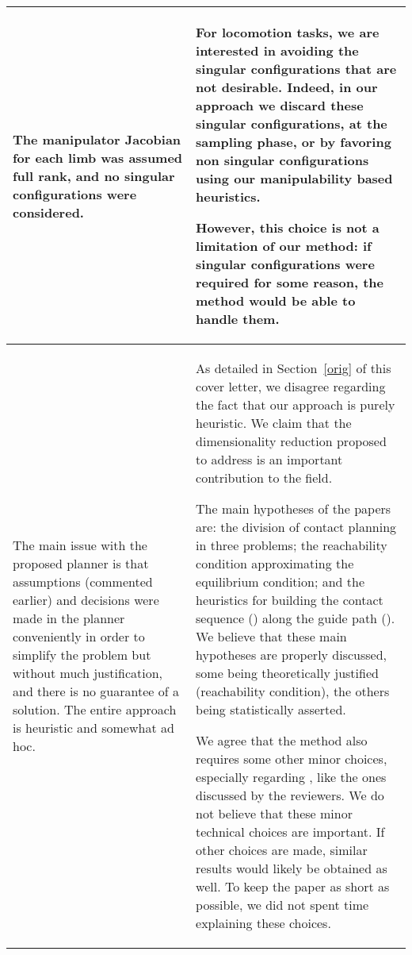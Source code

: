 \documentclass[a4paper]{article}
\begin{document}
\begin{longtable}{|p{21em}|p{21em}|}
\\ \hline %
The manipulator Jacobian for each limb was assumed full rank, and no singular configurations were considered. 
&
For locomotion tasks, we are interested in avoiding the singular configurations that are not desirable.
Indeed, in our approach we discard these singular configurations, at the sampling phase, or by favoring non singular configurations
using our manipulability based heuristics.

However, this choice is not a limitation of our method: if singular configurations were required for some reason, the method would be able
to handle them.

\\ \hline %
The main issue with the proposed planner is that assumptions (commented earlier) and decisions were made in the planner conveniently in order to simplify the problem but without much justification, and there is no guarantee of a solution. The entire approach is heuristic and somewhat ad hoc. 
&
As detailed in Section~\ref{orig} of this cover letter, we disagree regarding the fact that our approach is purely heuristic.
We claim that the dimensionality reduction proposed to address \mP1 is an important contribution to the field.

The main hypotheses of the papers are: the division of contact planning in three problems; the reachability condition approximating the equilibrium condition; and the heuristics for building the contact sequence (\mP2) along the guide path (\mP1).
We believe that these main hypotheses are properly discussed, some being theoretically justified (reachability condition), the others being statistically asserted.


We agree that the method also requires some other minor choices, especially regarding \mP2, like the ones discussed by the reviewers. 
We do not believe that these minor technical choices are important. 
If other choices are made, similar results would likely be obtained as well.
To keep the paper as short as possible, we did not spent time explaining these choices.


\end{longtable}
\end{document}
